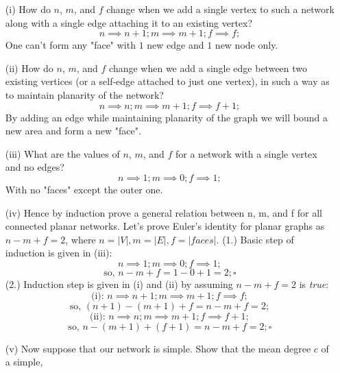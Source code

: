 \documentclass[12pt,a4paper,oneside,draft]{article}
\begin{document}
\begin{enumerate}
\begin{itemize}
      \item [(i) ] How do $n$, $m$, and $f$ change when we add a single vertex to such a network 
      along with a single edge attaching it to an existing vertex?
      \newline
        $$n \implies n + 1; m \implies m + 1; f \implies f;$$
      One can't form any "face" with $1$ new edge and $1$ new node only.
      \newline
      \newline
      \item [(ii) ] How do $n$, $m$, and $f$ change when we add a single edge between two existing vertices
      (or a self-edge attached to just one vertex), in such a way as to maintain planarity of the network?
      \newline
        $$n \implies n; m \implies m + 1; f \implies f + 1;$$
      By adding an edge while maintaining planarity of the graph we will bound a new area and form a new "face".
      \newline
      \newline
      \item [(iii) ] What are the values of $n$, $m$, and $f$ for a network with a single vertex and no edges?
        $$n \implies 1; m \implies 0; f \implies 1;$$
      With no "faces" except the outer one.
      \newline
      \newline
      \item [(iv) ] Hence by induction prove a general relation between n, m, and f for all
      connected planar networks.
      \newline
      \newline
      Let's prove Euler's identity for planar graphs as $n - m + f = 2$, where
      $n = |V|, m = |E|, f = |\textit{faces}|$.
      \newline
      (1.) Basic step of induction is given in (iii):
        $$n \implies 1; m \implies 0; f \implies 1;$$
        $$\text{so, } n - m + f = 1 - 0 + 1 = 2; \square$$
      \newline
      (2.) Induction step is given in (i) and (ii) by assuming $n - m + f = 2$ is \textit{true}:
        $$\text{(i): } n \implies n + 1; m \implies m + 1; f \implies f;$$
        $$\text{so, } (n + 1) - (m + 1) + f = n - m + f = 2;$$
        $$\text{(ii): } n \implies n; m \implies m + 1; f \implies f + 1;$$
        $$\text{so, } n - (m + 1) + (f + 1) = n - m + f = 2; \square$$
      \newline
      \item [(v) ] Now suppose that our network is simple. Show that the mean degree $c$ of a simple,

\end{itemize}
\end{enumerate}
\end{document}
